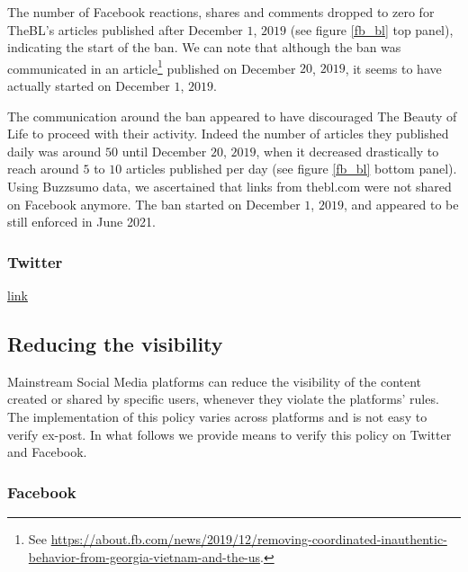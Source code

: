 \documentclass{article}
\begin{document}
The number of Facebook reactions, shares and comments dropped to zero for TheBL’s articles published after December $1$, $2019$ (see figure \ref{fb_bl} top panel), indicating the start of the ban. We can note that although the ban was communicated in an article\footnote{See \href{https://about.fb.com/news/2019/12/removing-coordinated-inauthentic-behavior-from-georgia-vietnam-and-the-us}{https://about.fb.com/news/2019/12/removing-coordinated-inauthentic-behavior-from-georgia-vietnam-and-the-us}.} published on December $20$, $2019$, it seems to have actually started on December $1$, $2019$.

The communication around the ban appeared to have discouraged The Beauty of Life to proceed with their activity. Indeed the number of articles they published daily was around $50$ until December $20$, $2019$, when it decreased drastically to reach around $5$ to $10$ articles published per day (see figure \ref{fb_bl} bottom panel). Using Buzzsumo data, we ascertained that links from thebl.com were not shared on Facebook anymore. The ban started on December $1$, $2019$, and appeared to be still enforced in June 2021.

\subsubsection{Twitter}

\href{https://help.twitter.com/en/safety-and-security/phishing-spam-and-malware-links}{link}
\subsection{Reducing the visibility}

Mainstream Social Media platforms can reduce the visibility of the content created or shared by specific users, whenever they violate the platforms' rules. The implementation of this policy varies across platforms and is not easy to verify ex-post. In what follows we provide means to verify this policy on Twitter and Facebook.  

\subsubsection{Facebook}
\end{document}

